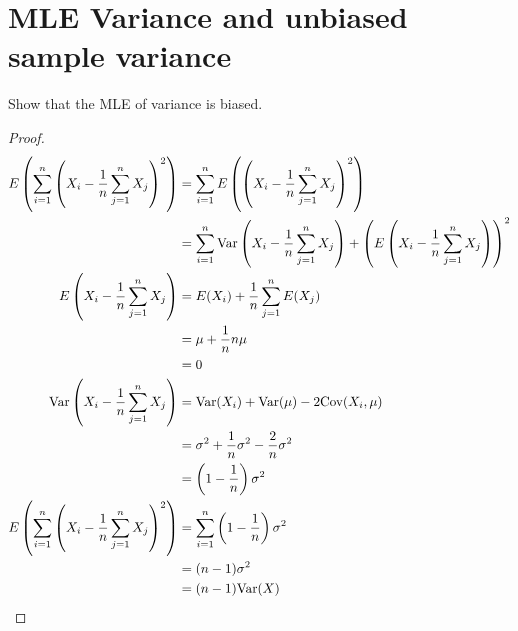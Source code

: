 \documentclass{article}
\begin{document}
\section{MLE Variance and unbiased sample variance}
    Show that the MLE of variance is biased. 
    \begin{proof}
        \begin{align*}
            E\left(\sum_{i=1}^n \left(X_i - \frac{1}{n}\sum_{j=1}^n
            X_j\right)^2\right) &= \sum_{i=1}^n E\left(\left(X_i -
            \frac{1}{n}\sum_{j=1}^n
            X_j\right)^2\right)
            \\
            &= \sum_{i=1}^n \text{Var}\left(X_i -
            \frac{1}{n}\sum_{j=1}^n X_j\right) + \left(E\left(X_i -
            \frac{1}{n}\sum_{j=1}^n X_j\right)\right)^2
            \\
            E\left(X_i -
            \frac{1}{n}\sum_{j=1}^n X_j\right) &= E(X_i) +
            \frac{1}{n}\sum_{j=1}^n E(X_j)
            \\
            &= \mu + \frac{1}{n}n\mu
            \\
            &= 0 
            \\
            \text{Var}\left(X_i -
            \frac{1}{n}\sum_{j=1}^n X_j\right) &= 
            \text{Var}(X_i) + \text{Var}(\mu) - 2\text{Cov}(X_i,\mu)
            \\
            &= \sigma^2 + \frac{1}{n}\sigma^2 -
            \frac{2}{n}\sigma^2
            \\
            &= \left(1-\frac{1}{n}\right)\sigma^2
            \\
            E\left(\sum_{i=1}^n \left(X_i - \frac{1}{n}\sum_{j=1}^n
            X_j\right)^2\right) &= \sum_{i=1}^n \left(1 -
            \frac{1}{n}\right)\sigma^2
            \\
            &= (n-1)\sigma^2
            \\
            &= (n-1)\text{Var}(X)
        \end{align*}
    \end{proof}
\end{document}
